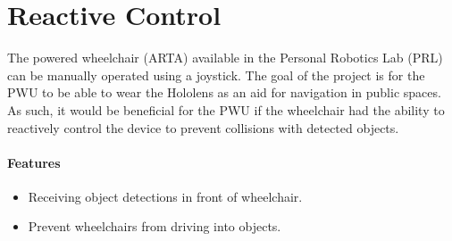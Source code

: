 \section{Reactive Control}
The powered wheelchair (ARTA) available in the Personal Robotics Lab (PRL) can be manually operated using a joystick. The goal of the project is for the PWU to be able to wear the Hololens as an aid for navigation in public spaces. As such, it would be beneficial for the PWU if the wheelchair had the ability to reactively control the device to prevent collisions with detected objects.

\paragraph{Features}
\begin{itemize}
	\item Receiving object detections in front of wheelchair.
	\item Prevent wheelchairs from driving into objects.
\end{itemize}
